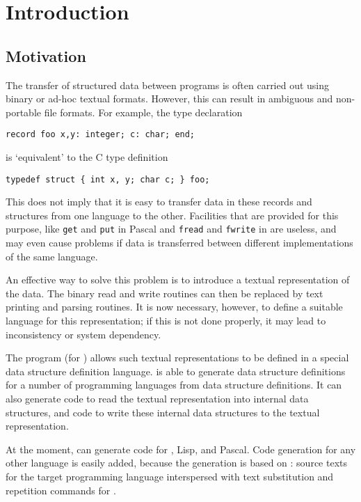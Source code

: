 \chapter{Introduction}
\label{s.intro}
\section{Motivation}
The transfer of structured data between programs is often carried out
using binary or ad-hoc textual formats.
However, this can result in ambiguous and non-portable file formats.
For example,
the {\Pascal} type declaration
\par
\begin{verbatim}
record foo x,y: integer; c: char; end;
\end{verbatim}
\par
is `equivalent' to the C type definition
\par
\begin{verbatim}
typedef struct { int x, y; char c; } foo;
\end{verbatim}
\par
This does not imply that it is easy to transfer data in these records
and structures from one language to the other.
Facilities that are provided for this purpose, like \texttt{get} and
\texttt{put} in Pascal and \texttt{fread} and \texttt{fwrite} in {\C} are useless,
and may even cause problems if data is transferred between different
implementations of the same language.
\par
An effective way to solve this problem is to introduce a textual
representation of the data.
The binary read and write routines can then be replaced by text printing and
parsing routines.
It is now necessary,
however, to define a suitable language for this representation;
if this is not done properly,
it may lead to inconsistency or system dependency.
\par
The program  (for ) allows such textual
representations to be defined in
a special data structure definition language.
{\Tm} is able to generate data structure definitions for a number of
programming languages from {\Tm} data structure definitions.
It can also generate code to read the textual representation into
internal data structures, and code to write these internal data structures
to the textual representation.
\par
At the moment, {\Tm} can generate code for {\C}, Lisp, {\Miranda} and Pascal.
Code generation for any other language is easily added,
because the generation is based on :
source texts for the target programming language
interspersed with text substitution and repetition commands for {\Tm}.

